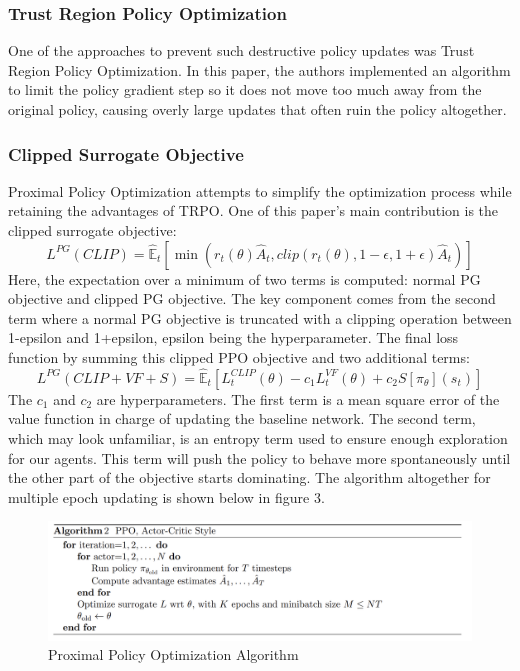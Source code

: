 \documentclass[conference]{IEEEtran}
\begin{document}
\subsubsection{Trust Region Policy Optimization}
One of the approaches to prevent such destructive policy updates was Trust Region Policy Optimization\cite{https://doi.org/10.48550/arxiv.1502.05477}.
In this paper, the authors implemented an algorithm to limit the policy gradient step so it does not move too much away from the original policy, causing overly large updates that often ruin the policy altogether.
\subsubsection{Clipped Surrogate Objective}
Proximal Policy Optimization attempts to simplify the optimization process while retaining the advantages of TRPO.
One of this paper's main contribution is the clipped surrogate objective:
\begin{equation}
    {L}^{PG}(CLIP) = {\hat{\mathbb{E}}}_{t}[\min({r}_{t}(\theta)\hat{A}_{t},clip({r}_{t}(\theta), 1-\epsilon, 1+\epsilon)\hat{A}_{t})]
\end{equation}
Here, the expectation over a minimum of two terms is computed: normal PG objective and clipped PG objective. The key component comes from the second term where a normal PG objective is truncated with a clipping operation between 1-epsilon and 1+epsilon, epsilon being the hyperparameter.
The final loss function by summing this clipped PPO objective and two additional terms:
\begin{equation}
    {L}^{PG}(CLIP+VF+S) = {\hat{\mathbb{E}}}_{t}[L^{CLIP}_{t}(\theta) - c_{1}L^{VF}_{t}(\theta) + c_{2}S[\pi_{\theta}](s_{t})]
\end{equation}
The $c_{1}$ and $c_{2}$ are hyperparameters. The first term is a mean square error of the value function in charge of updating the baseline network. The second term, which may look unfamiliar, is an entropy term used to ensure enough exploration for our agents. This term will push the policy to behave more spontaneously until the other part of the objective starts dominating.
The algorithm altogether for multiple epoch updating is shown below in figure 3.

\begin{figure}[htbp]
\centerline{\includegraphics[width=1.0\linewidth]{images/ppo_algorithm.png}}
\caption{Proximal Policy Optimization Algorithm}
\label{fig6}
\end{figure}
\end{document}
